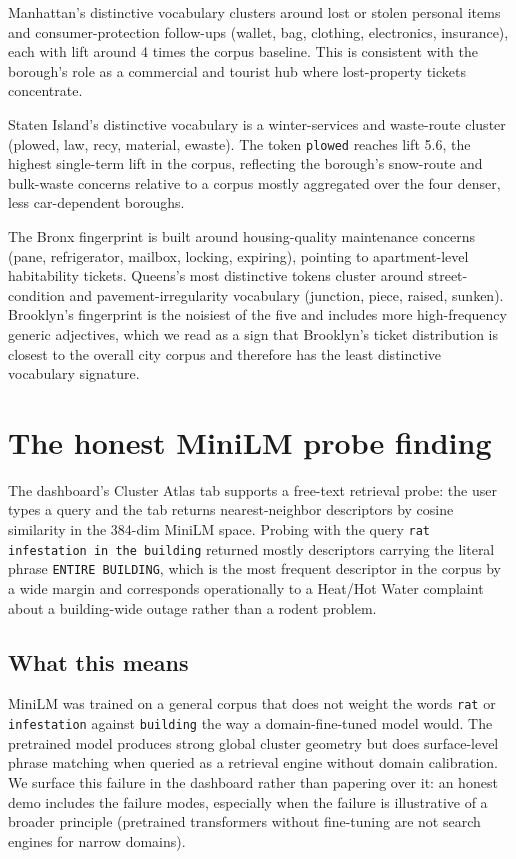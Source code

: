 \documentclass[11pt,letterpaper]{book}
\begin{document}
Manhattan's distinctive vocabulary clusters around lost or stolen personal items and consumer-protection follow-ups (wallet, bag, clothing, electronics, insurance), each with lift around 4 times the corpus baseline. This is consistent with the borough's role as a commercial and tourist hub where lost-property tickets concentrate.

Staten Island's distinctive vocabulary is a winter-services and waste-route cluster (plowed, law, recy, material, ewaste). The token \texttt{plowed} reaches lift 5.6, the highest single-term lift in the corpus, reflecting the borough's snow-route and bulk-waste concerns relative to a corpus mostly aggregated over the four denser, less car-dependent boroughs.

The Bronx fingerprint is built around housing-quality maintenance concerns (pane, refrigerator, mailbox, locking, expiring), pointing to apartment-level habitability tickets. Queens's most distinctive tokens cluster around street-condition and pavement-irregularity vocabulary (junction, piece, raised, sunken). Brooklyn's fingerprint is the noisiest of the five and includes more high-frequency generic adjectives, which we read as a sign that Brooklyn's ticket distribution is closest to the overall city corpus and therefore has the least distinctive vocabulary signature.

\section{The honest MiniLM probe finding}
\label{sec:results-minilm-probe}

The dashboard's Cluster Atlas tab supports a free-text retrieval probe: the user types a query and the tab returns nearest-neighbor descriptors by cosine similarity in the 384-dim MiniLM space. Probing with the query \texttt{rat infestation in the building} returned mostly descriptors carrying the literal phrase \texttt{ENTIRE BUILDING}, which is the most frequent descriptor in the corpus by a wide margin and corresponds operationally to a Heat/Hot Water complaint about a building-wide outage rather than a rodent problem.

\subsection*{What this means}

MiniLM was trained on a general corpus that does not weight the words \texttt{rat} or \texttt{infestation} against \texttt{building} the way a domain-fine-tuned model would. The pretrained model produces strong global cluster geometry but does surface-level phrase matching when queried as a retrieval engine without domain calibration. We surface this failure in the dashboard rather than papering over it: an honest demo includes the failure modes, especially when the failure is illustrative of a broader principle (pretrained transformers without fine-tuning are not search engines for narrow domains).
\end{document}
